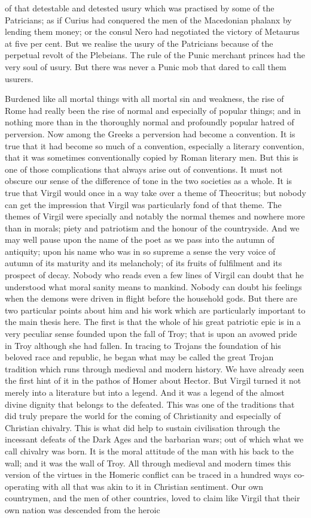 of that detestable and detested usury which was practised by some of the Patricians; as if Curius had conquered the men of the Macedonian phalanx by lending them money; or the consul Nero had negotiated the victory of Metaurus at five per cent. But we realise the usury of the Patricians because of the perpetual revolt of the Plebeians. The rule of the Punic merchant princes had the very soul of usury. But there was never a Punic mob that dared to call them usurers.

Burdened like all mortal things with all mortal sin and weakness, the rise of Rome had really been the rise of normal and especially of popular things; and in nothing more than in the thoroughly normal and profoundly popular hatred of perversion. Now among the Greeks a perversion had become a convention. It is true that it had become so much of a convention, especially a literary convention, that it was sometimes conventionally copied by Roman literary men. But this is one of those complications that always arise out of conventions. It must not obscure our sense of the difference of tone in the two societies as a whole. It is true that Virgil would once in a way take over a theme of Theocritus; but nobody can get the impression that Virgil was particularly fond of that theme. The themes of Virgil were specially and notably the normal themes and nowhere more than in morals; piety and patriotism and the honour of the countryside. And we may well pause upon the name of the poet as we pass into the autumn of antiquity; upon his name who was in so supreme a sense the very voice of autumn of its maturity and its melancholy; of its fruits of fulfilment and its prospect of decay. Nobody who reads even a few lines of Virgil can doubt that he understood what moral sanity means to mankind. Nobody can doubt his feelings when the demons were driven in flight before the household gods. But there are two particular points about him and his work which are particularly important to the main thesis here. The first is that the whole of his great patriotic epic is in a very peculiar sense founded upon the fall of Troy; that is upon an avowed pride in Troy although she had fallen. In tracing to Trojans the foundation of his beloved race and republic, he began what may be called the great Trojan tradition which runs through medieval and modern history. We have already seen the first hint of it in the pathos of Homer about Hector. But Virgil turned it not merely into a literature but into a legend. And it was a legend of the almost divine dignity that belongs to the defeated. This was one of the traditions that did truly prepare the world for the coming of Christianity and especially of Christian chivalry. This is what did help to sustain civilisation through the incessant defeats of the Dark Ages and the barbarian wars; out of which what we call chivalry was born. It is the moral attitude of the man with his back to the wall; and it was the wall of Troy. All through medieval and modern times this version of the virtues in the Homeric conflict can be traced in a hundred ways co-operating with all that was akin to it in Christian sentiment. Our own countrymen, and the men of other countries, loved to claim like Virgil that their own nation was descended from the heroic 